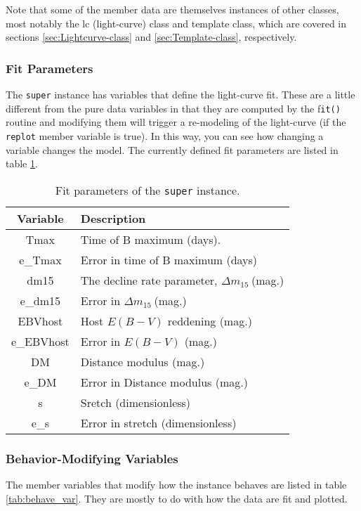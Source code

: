 \documentclass[12pt]{article}
\providecommand{\tabularnewline}{\\}
\newcommand{\dmf}{$\Delta m_{15}\ $}
\begin{document}
Note that some of the member data are themselves instances of other
classes, most notably the lc (light-curve) class and template class,
which are covered in sections \ref{sec:Lightcurve-class} and \ref{sec:Template-class},
respectively.


\subsubsection{Fit Parameters}

The \texttt{super} instance has variables that define the light-curve
fit. These are a little different from the pure data variables in
that they are computed by the f\texttt{it()} routine and modifying
them will trigger a re-modeling of the light-curve (if the \texttt{replot}
member variable is true). In this way, you can see how changing a
variable changes the model. The currently defined fit parameters are
listed in table \ref{tab:fit_param}.

%
\begin{table}
\begin{tabular}{|c|l|}
\hline 
Variable&
Description\tabularnewline
\hline
\hline 
Tmax&
Time of B maximum (days).\tabularnewline
\hline 
e\_Tmax&
Error in time of B maximum (days)\tabularnewline
\hline 
dm15&
The decline rate parameter, \dmf (mag.)\tabularnewline
\hline 
e\_dm15&
Error in \dmf (mag.)\tabularnewline
\hline 
EBVhost&
Host $E\left(B-V\right)$ reddening (mag.)\tabularnewline
\hline 
e\_EBVhost&
Error in $E\left(B-V\right)$ (mag.)\tabularnewline
\hline 
DM&
Distance modulus (mag.)\tabularnewline
\hline 
e\_DM&
Error in Distance modulus (mag.)\tabularnewline
\hline 
s&
Sretch (dimensionless)\tabularnewline
\hline 
e\_s&
Error in stretch (dimensionless)\tabularnewline
\hline
\end{tabular}


\caption{Fit parameters of the \texttt{super} instance.\label{tab:fit_param}}
\end{table}



\subsubsection{Behavior-Modifying Variables\label{sub:Behaviour-Modifying-Variables}}

The member variables that modify how the instance behaves are listed
in table \ref{tab:behave_var}. They are mostly to do with how the
data are fit and plotted.
\end{document}
